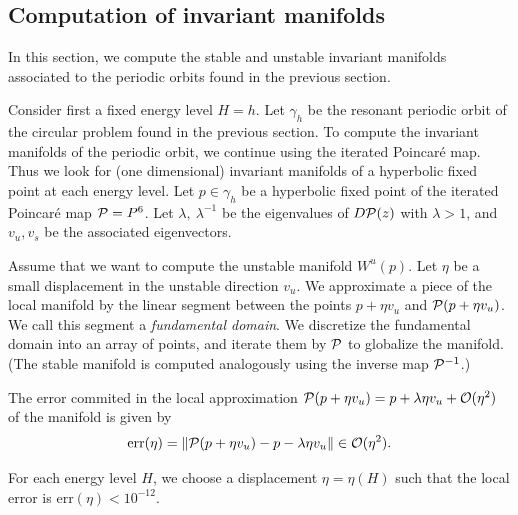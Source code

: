 \subsection{Computation of invariant manifolds}
\label{sec:invariant_manifolds}


In this section, we compute the stable and unstable invariant
manifolds associated to the periodic orbits found in the previous
section. 

Consider first a fixed energy level $H=h$.
Let $\gamma_h$ be the resonant periodic orbit of the circular problem
found in the previous section. 
To compute the invariant manifolds of the periodic orbit, we continue
using the iterated Poincar{\'e} map.
Thus we look for (one dimensional) invariant manifolds of a hyperbolic
fixed point at each energy level.  
Let $p \in \gamma_h$ be a hyperbolic fixed point of the iterated
Poincar\'e map $\mathcal{P} = P^6$. 
Let $\lambda, \ \lambda^{-1}$ be the eigenvalues of $D\mathcal{P}(z)$ with
$\lambda>1$, and $v_u, v_s$ be the associated eigenvectors.

Assume that we want to compute the unstable manifold $W^u(p)$.
Let $\eta$ be a small displacement in the unstable direction $v_u$.
We approximate a piece of the local manifold by the linear segment
between the points $p+\eta v_u$ and $\mathcal{P}(p+\eta v_u)$.
We call this segment a \emph{fundamental domain}.
We discretize the fundamental domain into an array of points, and
iterate them by $\mathcal{P}$ to globalize the manifold.
(The stable manifold is computed analogously using the inverse map
$\mathcal{P}^{-1}$.)

The error commited in the local approximation
$ \mathcal{P}(p+\eta v_u) = p + \lambda \eta v_u + \mathcal{O}(\eta^2) $
of the manifold is given by
\[ \mathrm{err}(\eta) = \left\|\mathcal{P}(p+\eta v_u) - p - \lambda \eta v_u \right\| \in \mathcal{O}(\eta^2).
\]

\begin{remark} \label{rem:displacement}
For each energy level $H$, we choose a displacement $\eta=\eta(H)$
such that the local error is $\mathrm{err}(\eta) < 10^{-12}$.
\end{remark}

